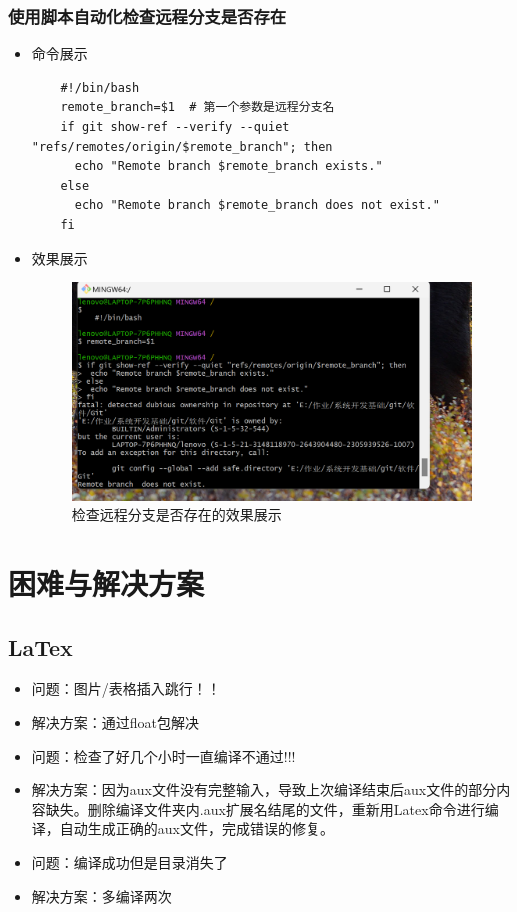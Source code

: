 \documentclass[UTF8]{ctexart}
\begin{document}
\subsubsection{使用脚本自动化检查远程分支是否存在}
\begin{itemize}
  \item 命令展示
  \begin{verbatim}
    #!/bin/bash
    remote_branch=$1  # 第一个参数是远程分支名
    if git show-ref --verify --quiet "refs/remotes/origin/$remote_branch"; then
      echo "Remote branch $remote_branch exists."
    else
      echo "Remote branch $remote_branch does not exist."
    fi
  \end{verbatim}

  \item 效果展示
  \begin{figure}[H]
    \centering
    \includegraphics[width=\textwidth]{25} %
    \caption{检查远程分支是否存在的效果展示}
    \label{fig:remote-branch-check}
  \end{figure}
\end{itemize}

  \section{困难与解决方案}
  \subsection{LaTex}
\begin{itemize}
\item 问题：图片/表格插入跳行！！
\item 解决方案：通过float包解决

\item 问题：检查了好几个小时一直编译不通过!!!
\item 解决方案：因为aux文件没有完整输入，导致上次编译结束后aux文件的部分内容缺失。删除编译文件夹内.aux扩展名结尾的文件，重新用Latex命令进行编译，自动生成正确的aux文件，完成错误的修复。

\item 问题：编译成功但是目录消失了
\item 解决方案：多编译两次
 \end{itemize}
\end{document}
